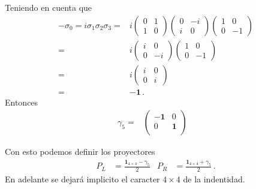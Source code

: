 Teniendo en cuenta que
\begin{align}
  -\sigma_0=i\sigma_1\sigma_2\sigma_3=&
  i\begin{pmatrix}
    0 & 1 \\
    1 & 0 
  \end{pmatrix}
  \begin{pmatrix}
    0 & -i \\
    i & 0
  \end{pmatrix}
  \begin{pmatrix}
    1 & 0 \\
    0 & -1
  \end{pmatrix}\nonumber\\
  =&
  i\begin{pmatrix}
    i & 0 \\
    0 & -i 
  \end{pmatrix}
  \begin{pmatrix}
    1 & 0 \\
    0 & -1
  \end{pmatrix}\nonumber\\
  =&i\begin{pmatrix}
    i & 0 \\
    0 & i
  \end{pmatrix}\nonumber\\
  =&-\mathbf{1}\,.
\end{align}
Entonces
\begin{align}
  \gamma_5=&
  \begin{pmatrix}
    -\mathbf{1} & 0\\
    0  & \mathbf{1}\\
  \end{pmatrix}& 
\end{align}

Con esto podemos definir los proyectores
\begin{align}
  P_L&=\frac{\mathbf{1}_{4\times4}-\gamma_5}{2} & P_R&=\frac{\mathbf{1}_{4\times4}+\gamma_5}{2}\,.
\end{align}
En adelante se dejará implicito el caracter $4\times4$ de la indentidad. 

